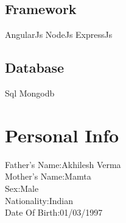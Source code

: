 \documentclass[]{resume-openfont}
\begin{document}
\begin{minipage}[t]{0.33\textwidth}
\subsection{Framework}
AngularJs \textbullet{} NodeJs \textbullet{} ExpressJs \textbullet{}
\subsection{Database}
Sql \textbullet{} Mongodb 
\sectionsep

\section{Personal Info}
Father's Name:Akhilesh Verma\\
Mother's Name:Mamta\\
Sex:Male\\
Nationality:Indian\\
Date Of Birth:01/03/1997\\

%
%

\end{minipage} 
\hfill
\end{document}
